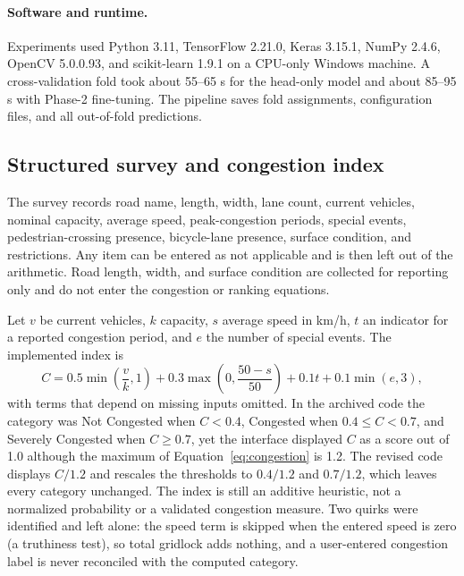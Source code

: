 \documentclass[11pt]{article}
\begin{document}
\paragraph{Software and runtime.} Experiments used Python 3.11, TensorFlow 2.21.0, Keras 3.15.1, NumPy 2.4.6, OpenCV 5.0.0.93, and scikit-learn 1.9.1 on a CPU-only Windows machine. A cross-validation fold took about 55--65 s for the head-only model and about 85--95 s with Phase-2 fine-tuning. The pipeline saves fold assignments, configuration files, and all out-of-fold predictions.

\subsection{Structured survey and congestion index}
The survey records road name, length, width, lane count, current vehicles, nominal capacity, average speed, peak-congestion periods, special events, pedestrian-crossing presence, bicycle-lane presence, surface condition, and restrictions. Any item can be entered as not applicable and is then left out of the arithmetic. Road length, width, and surface condition are collected for reporting only and do not enter the congestion or ranking equations.

Let $v$ be current vehicles, $k$ capacity, $s$ average speed in km/h, $t$ an indicator for a reported congestion period, and $e$ the number of special events. The implemented index is
\begin{equation}
C=0.5\min\left(\frac{v}{k},1\right)+0.3\max\left(0,\frac{50-s}{50}\right)+0.1t+0.1\min(e,3),
\label{eq:congestion}
\end{equation}
with terms that depend on missing inputs omitted. In the archived code the category was Not Congested when $C<0.4$, Congested when $0.4\le C<0.7$, and Severely Congested when $C\ge0.7$, yet the interface displayed $C$ as a score out of 1.0 although the maximum of Equation~\ref{eq:congestion} is 1.2. The revised code displays $C/1.2$ and rescales the thresholds to $0.4/1.2$ and $0.7/1.2$, which leaves every category unchanged. The index is still an additive heuristic, not a normalized probability or a validated congestion measure. Two quirks were identified and left alone: the speed term is skipped when the entered speed is zero (a truthiness test), so total gridlock adds nothing, and a user-entered congestion label is never reconciled with the computed category.
\end{document}
